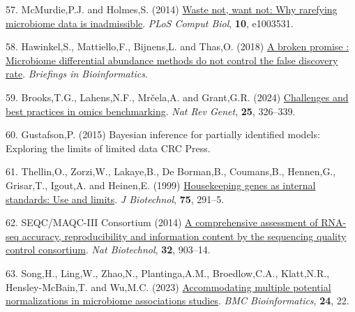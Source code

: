 \documentclass[
]{article}
\newlength{\cslhangindent}
\newenvironment{CSLReferences}[2] %
 {\begin{list}{}{%
  \setlength{\itemindent}{0pt}
  \setlength{\leftmargin}{0pt}
  \setlength{\parsep}{0pt}
  \ifodd #1
   \setlength{\leftmargin}{\cslhangindent}
   \setlength{\itemindent}{-1\cslhangindent}
  \fi
  \setlength{\itemsep}{#2\baselineskip}}}
 {\end{list}}
\begin{document}
\begin{CSLReferences}{1}{1}
57. McMurdie,P.J. and Holmes,S. (2014)
\href{https://doi.org/10.1371/journal.pcbi.1003531}{Waste not, want not:
Why rarefying microbiome data is inadmissible}. \emph{PLoS Comput Biol},
\textbf{10}, e1003531.

58. Hawinkel,S., Mattiello,F., Bijnens,L. and Thas,O. (2018)
\href{http://dx.doi.org/10.1093/bib/bbx104}{A broken promise :
Microbiome differential abundance methods do not control the false
discovery rate}. \emph{Briefings in Bioinformatics}.

59. Brooks,T.G., Lahens,N.F., Mrčela,A. and Grant,G.R. (2024)
\href{https://doi.org/10.1038/s41576-023-00679-6}{Challenges and best
practices in omics benchmarking}. \emph{Nat Rev Genet}, \textbf{25},
326--339.

60. Gustafson,P. (2015) Bayesian inference for partially identified
models: Exploring the limits of limited data CRC Press.

61. Thellin,O., Zorzi,W., Lakaye,B., De Borman,B., Coumans,B.,
Hennen,G., Grisar,T., Igout,A. and Heinen,E. (1999)
\href{https://www.ncbi.nlm.nih.gov/pubmed/10617337}{Housekeeping genes
as internal standards: Use and limits}. \emph{J Biotechnol},
\textbf{75}, 291--5.

62. SEQC/MAQC-III Consortium (2014)
\href{https://doi.org/10.1038/nbt.2957}{A comprehensive assessment of
RNA-seq accuracy, reproducibility and information content by the
sequencing quality control consortium}. \emph{Nat Biotechnol},
\textbf{32}, 903--14.

63. Song,H., Ling,W., Zhao,N., Plantinga,A.M., Broedlow,C.A.,
Klatt,N.R., Hensley-McBain,T. and Wu,M.C. (2023)
\href{https://doi.org/10.1186/s12859-023-05147-w}{Accommodating multiple
potential normalizations in microbiome associations studies}. \emph{BMC
Bioinformatics}, \textbf{24}, 22.

\end{CSLReferences}
\end{document}
